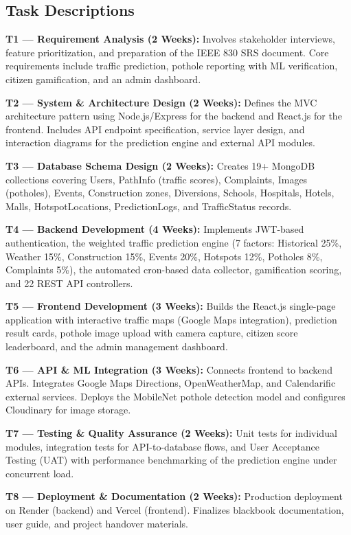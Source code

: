 \documentclass[12pt,a4paper]{article}
\begin{document}
\subsection{Task Descriptions}

\textbf{T1 --- Requirement Analysis (2 Weeks):}
Involves stakeholder interviews, feature prioritization, and preparation of the IEEE 830 SRS document. Core requirements include traffic prediction, pothole reporting with ML verification, citizen gamification, and an admin dashboard.

\textbf{T2 --- System \& Architecture Design (2 Weeks):}
Defines the MVC architecture pattern using Node.js/Express for the backend and React.js for the frontend. Includes API endpoint specification, service layer design, and interaction diagrams for the prediction engine and external API modules.

\textbf{T3 --- Database Schema Design (2 Weeks):}
Creates 19+ MongoDB collections covering Users, PathInfo (traffic scores), Complaints, Images (potholes), Events, Construction zones, Diversions, Schools, Hospitals, Hotels, Malls, HotspotLocations, PredictionLogs, and TrafficStatus records.

\textbf{T4 --- Backend Development (4 Weeks):}
Implements JWT-based authentication, the weighted traffic prediction engine (7 factors: Historical 25\%, Weather 15\%, Construction 15\%, Events 20\%, Hotspots 12\%, Potholes 8\%, Complaints 5\%), the automated cron-based data collector, gamification scoring, and 22 REST API controllers.

\textbf{T5 --- Frontend Development (3 Weeks):}
Builds the React.js single-page application with interactive traffic maps (Google Maps integration), prediction result cards, pothole image upload with camera capture, citizen score leaderboard, and the admin management dashboard.

\textbf{T6 --- API \& ML Integration (3 Weeks):}
Connects frontend to backend APIs. Integrates Google Maps Directions, OpenWeatherMap, and Calendarific external services. Deploys the MobileNet pothole detection model and configures Cloudinary for image storage.

\textbf{T7 --- Testing \& Quality Assurance (2 Weeks):}
Unit tests for individual modules, integration tests for API-to-database flows, and User Acceptance Testing (UAT) with performance benchmarking of the prediction engine under concurrent load.

\textbf{T8 --- Deployment \& Documentation (2 Weeks):}
Production deployment on Render (backend) and Vercel (frontend). Finalizes blackbook documentation, user guide, and project handover materials.
\end{document}
